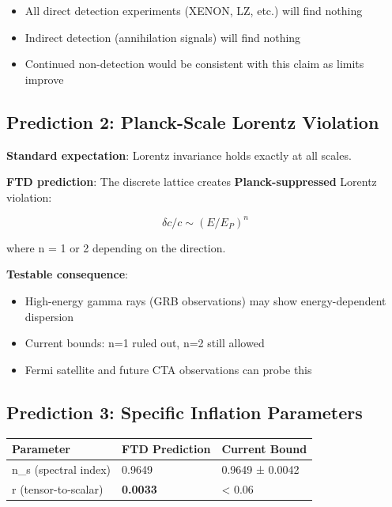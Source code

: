 \documentclass[
  11pt,
  letterpaper,
  twoside,
  openany]{book}
\makeatletter
\providecommand{\tightlist}{%
  \setlength{\itemsep}{0pt}\setlength{\parskip}{0pt}}
\let\orig@subsection\subsection
\renewcommand{\subsection}{\needspace{6\baselineskip}\orig@subsection}
\makeatother
\begin{document}
\begin{itemize}
\tightlist
\item
  All direct detection experiments (XENON, LZ, etc.) will find nothing
\item
  Indirect detection (annihilation signals) will find nothing
\item
  Continued non-detection would be consistent with this claim as limits
  improve
\end{itemize}

\subsection{Prediction 2: Planck-Scale Lorentz
Violation}\label{prediction-2-planck-scale-lorentz-violation}

\textbf{Standard expectation}: Lorentz invariance holds exactly at all
scales.

\textbf{FTD prediction}: The discrete lattice creates
\textbf{Planck-suppressed} Lorentz violation:

\[\delta c/c \sim (E/E_P)^n\]

where n = 1 or 2 depending on the direction.

\textbf{Testable consequence}:

\begin{itemize}
\tightlist
\item
  High-energy gamma rays (GRB observations) may show energy-dependent
  dispersion
\item
  Current bounds: n=1 ruled out, n=2 still allowed
\item
  Fermi satellite and future CTA observations can probe this
\end{itemize}

\subsection{Prediction 3: Specific Inflation
Parameters}\label{prediction-3-specific-inflation-parameters}

\begin{longtable}[]{@{}lll@{}}
\toprule\noalign{}
Parameter & FTD Prediction & Current Bound \\
\midrule\noalign{}
\endhead
\bottomrule\noalign{}
\endlastfoot
n\_s (spectral index) & 0.9649 & 0.9649 ± 0.0042 \\
r (tensor-to-scalar) & \textbf{0.0033} & \textless{} 0.06 \\
\end{longtable}
\end{document}
